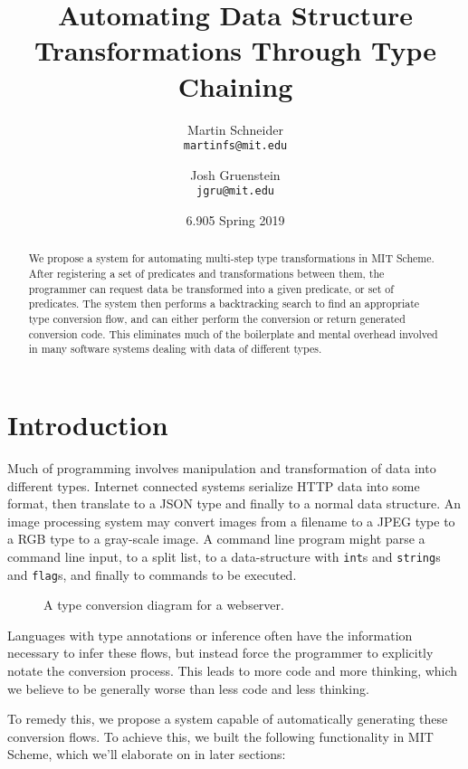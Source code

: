 \documentclass[letterpaper]{article}
\title{Automating Data Structure Transformations Through Type Chaining}
\author{
  Martin Schneider\\
  \texttt{martinfs@mit.edu} \and
  Josh Gruenstein\\
  \texttt{jgru@mit.edu}
}
\date{6.905 Spring 2019}
\begin{document}
 
\maketitle

\begin{abstract}
We propose a system for automating multi-step type transformations in MIT Scheme.  After registering a set of predicates and transformations between them, the programmer can request data be transformed into a given predicate, or set of predicates.  The system then performs a backtracking search to find an appropriate type conversion flow, and can either perform the conversion or return generated conversion code.  This eliminates much of the boilerplate and mental overhead involved in many software systems dealing with data of different types.
\end{abstract}

\section{Introduction}

Much of programming involves manipulation and transformation of data into different types.  Internet connected systems serialize HTTP data into some format, then translate to a JSON type and finally to a normal data structure.  An image processing system may convert images from a filename to a JPEG type to a RGB type to a gray-scale image.  A command line program might parse a command line input, to a split list, to a data-structure with \texttt{int}s and \texttt{string}s and \texttt{flag}s, and finally to commands to be executed.

\begin{figure}[h!]
\centering

\resizebox{14cm}{!} {
  
}

\caption{A type conversion diagram for a webserver.}
\label{webserver}
\end{figure}

Languages with type annotations or inference often have the information necessary to infer these flows, but instead force the programmer to explicitly notate the conversion process.  This leads to more code and more thinking, which we believe to be generally worse than less code and less thinking.

To remedy this, we propose a system capable of automatically generating these conversion flows.  To achieve this, we built the following functionality in MIT Scheme, which we'll elaborate on in later sections:
\end{document}
